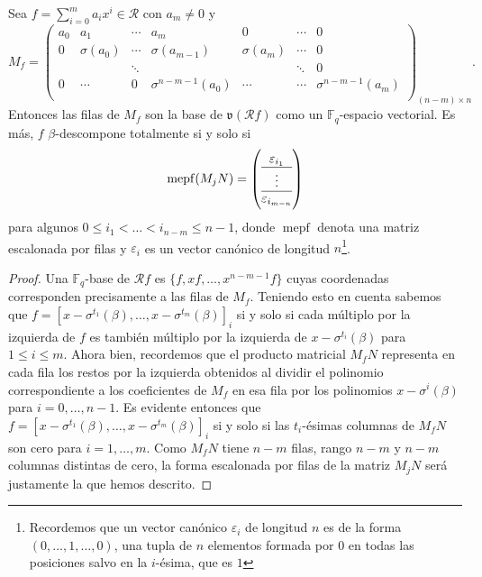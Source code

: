 \begin{lemma}
  \label{lem:matriz-mf-base}
  Sea \(f = \sum_{i=0}^m a_ix^i \in \mathcal R\) con \(a_m \neq 0\) y
  \[
    M_f = \begin{pmatrix}
      a_0 & a_1 & \cdots & a_m & 0 & \cdots & 0 \\
      0 & \sigma(a_0) & \cdots & \sigma(a_{m-1}) & \sigma(a_m) & \cdots & 0 \\
       &  & \ddots &  &  & \ddots & 0 \\
      0 & \cdots & 0 & \sigma^{n-m-1}(a_0) & \cdots & \cdots & \sigma^{n-m-1}(a_m) \\
    \end{pmatrix}_{(n-m) \times n}.
  \]
  Entonces las filas de \(M_f\) son la base de \(\mathfrak v(\mathcal Rf)\) como un \(\mathbb F_q\)-espacio vectorial.
  Es más, \(f\) \(\beta\)-descompone totalmente si y solo si 
  \[
    \operatorname{mepf}(M_jN) = \left( \begin{array}{@{}c@{}}
      \varepsilon_{i_1}\\\hline
      \vdots\\\hline
      \varepsilon_{i_{m-n}}
    \end{array}\right)
  \]
  para algunos \(0 \leq i_1 < \dots < i_{n-m} \leq n -1\), donde \(\operatorname{mepf}\) denota una matriz escalonada por filas y \(\varepsilon_i\) es un vector canónico de longitud \(n\)\footnote{Recordemos que un vector canónico \(\varepsilon_i\) de longitud \(n\) es de la forma \((0, \dots, 1, \dots, 0)\), una tupla de \(n\) elementos formada por \(0\) en todas las posiciones salvo en la \(i\)-ésima, que es \(1\)}.
\end{lemma}
\begin{proof}
  Una \(\mathbb F_q\)-base de \(\mathcal Rf\) es \(\{f, xf, \dots, x^{n-m-1}f\}\) cuyas coordenadas corresponden precisamente a las filas de \(M_f\).
  Teniendo esto en cuenta sabemos que \(f = \left[x - \sigma^{t_1}(\beta), \dots, x - \sigma^{t_m}(\beta)\right]_i\) si y solo si cada múltiplo por la izquierda de \(f\) es también múltiplo por la izquierda de \(x - \sigma^{t_i}(\beta)\) para \(1 \leq i \leq m\).
  Ahora bien, recordemos que el producto matricial \(M_fN\) representa en cada fila los restos por la izquierda obtenidos al dividir el polinomio correspondiente a los coeficientes de \(M_f\) en esa fila por los polinomios \(x - \sigma^i(\beta)\) para \(i = 0, \dots, n - 1\).
  Es evidente entonces que \(f = \left[x - \sigma^{t_1}(\beta), \dots, x - \sigma^{t_m}(\beta)\right]_i\) si y solo si las \(t_i\)-ésimas columnas de \(M_fN\) son cero para \(i = 1, \dots, m\).
  Como \(M_fN\) tiene \(n - m\) filas, rango \(n - m\) y \(n - m\) columnas distintas de cero, la forma escalonada por filas de la matriz \(M_jN\) será justamente la que hemos descrito.
\end{proof}


